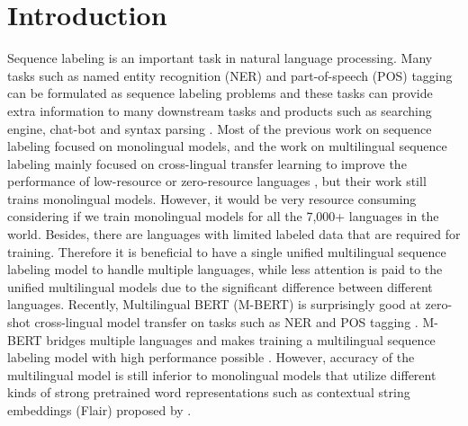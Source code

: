 \documentclass[11pt,a4paper]{article}
\begin{document}
\section{Introduction}
Sequence labeling is an important task in natural language processing. Many tasks such as named entity recognition (NER) and part-of-speech (POS) tagging can be formulated as sequence labeling problems and these tasks can provide extra information to many downstream tasks and products such as searching engine, chat-bot and syntax parsing \cite{Jurafsky:2009:SLP:1214993}. Most of the previous work on sequence labeling focused on monolingual models, and the work on multilingual sequence labeling mainly focused on cross-lingual transfer learning to improve the performance of low-resource or zero-resource languages \cite{johnson-etal-2019-cross,huang-etal-2019-cross,rahimi-etal-2019-massively,huang-etal-2019-matters,keung-etal-2019-adversarial}, but their work still trains monolingual models. However, it would be very resource consuming considering if we train monolingual models for all the 7,000+ languages in the world. Besides, there are languages with limited labeled data that are required for training. Therefore it is beneficial to have a single unified multilingual sequence labeling model to handle multiple languages, while less attention is paid to the unified multilingual models due to the significant difference between different languages. Recently, Multilingual BERT (M-BERT) \cite{devlin-etal-2019-bert} is surprisingly good at zero-shot cross-lingual model transfer on tasks such as NER and POS tagging \cite{pires-etal-2019-multilingual}. M-BERT bridges multiple languages and makes training a multilingual sequence labeling model with high performance possible \cite{wu-dredze-2019-beto}. However, accuracy of the multilingual model is still inferior to monolingual models that utilize different kinds of strong pretrained word representations such as contextual string embeddings (Flair) proposed by \citet{akbik-etal-2018-contextual}.
\end{document}
